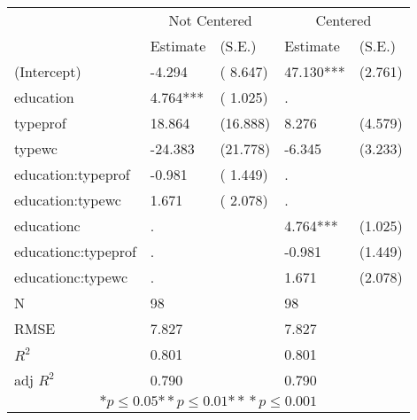 \begin{tabular}{*{5}{l}}
\hline
                  & \multicolumn{2}{c}{Not Centered} & \multicolumn{2}{c}{Centered}   \tabularnewline
                   &Estimate  &(S.E.)    &Estimate  &(S.E.)  \tabularnewline
 \hline
 \hline
   (Intercept)     &-4.294   &   ( 8.647) &47.130***   &   (2.761) \tabularnewline
   education       &4.764***   &   ( 1.025)   & .        &         \tabularnewline
   typeprof        &18.864   &   (16.888) &8.276   &   (4.579) \tabularnewline
   typewc          &-24.383   &   (21.778) &-6.345   &   (3.233) \tabularnewline
   education:typeprof    &-0.981   &   ( 1.449)   & .        &         \tabularnewline
   education:typewc    &1.671   &   ( 2.078)   & .        &         \tabularnewline
   educationc        & .        &         &4.764***   &   (1.025) \tabularnewline
   educationc:typeprof      & .        &         &-0.981   &   (1.449) \tabularnewline
   educationc:typewc      & .        &         &1.671   &   (2.078) \tabularnewline
 \hline
 N                 &98       &        &98       &        \tabularnewline
 RMSE             &7.827         & &7.827         & \tabularnewline
 $R^2$             &0.801         & &0.801         & \tabularnewline
 adj $R^2$         &0.790         & &0.790         & \tabularnewline
 \hline
\hline
 
 \multicolumn{5}{c}{${*  p}\le 0.05$${*\!\!*  p}\le 0.01$${*\!\!*\!\!*  p}\le 0.001$}\tabularnewline
 \end{tabular}